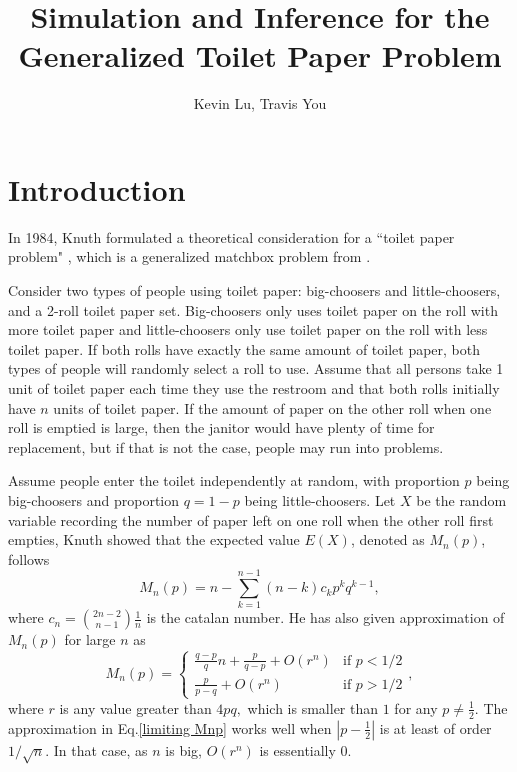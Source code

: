 \documentclass{article}
\author{Kevin Lu, Travis You}
\title{Simulation and Inference for the Generalized Toilet Paper Problem}
\begin{document}
\maketitle
\section{Introduction}
In 1984, Knuth formulated a theoretical consideration for a ``toilet paper problem" \cite{Knuth1984}, which is a generalized matchbox problem from \cite{Feller}. 

Consider two types of people using toilet paper: big-choosers and little-choosers, and a 2-roll toilet paper set. Big-choosers only uses toilet paper on the roll with more toilet paper and little-choosers only use toilet paper on the roll with less toilet paper. If both rolls have exactly the same amount of toilet paper, both types of people will randomly select a roll to use. Assume that all persons take 1 unit of toilet paper each time they use the restroom and that both rolls initially have $n$ units of toilet paper. If the amount of paper on the other roll when one roll is emptied is large, then the janitor would have plenty of time for replacement, but if that is not the case, people may run into problems.

Assume people enter the toilet independently at random, with proportion $p$ being big-choosers and proportion $q=1-p$ being little-choosers. Let $X$ be the random variable recording the number of paper left on one roll when the other roll first empties, Knuth showed that the expected value $E(X)$, denoted as $M_n(p)$, follows
\begin{equation}
    M_n(p) = n-\sum_{k=1}^{n-1} (n-k)c_k p^k q^{k-1}, 
\end{equation}
where $c_n = \binom{2n-2}{n-1}\frac{1}{n}$ is the catalan number. He has also given approximation of $M_n(p)$ for large $n$ as 
\begin{equation}
    M_n(p)=
    \begin{cases}
        \frac{q-p}{q}n+\frac{p}{q-p}+O(r^n) & \text{if }  p<1/2 \\
        \frac{p}{p-q} + O(r^n) & \text{if } p>1/2
    \end{cases}
    ,
    \label{limiting Mnp}
\end{equation}
where $r$ is any value greater than $4pq,$ which is smaller than $1$ for any $p \neq \frac{1}{2}$. The approximation in Eq.\eqref{limiting Mnp} works well when $|p-\frac{1}{2}|$ is at least of order $1/\sqrt{n}$. In that case, as $n$ is big, $O(r^n)$ is essentially 0. 
\end{document}
